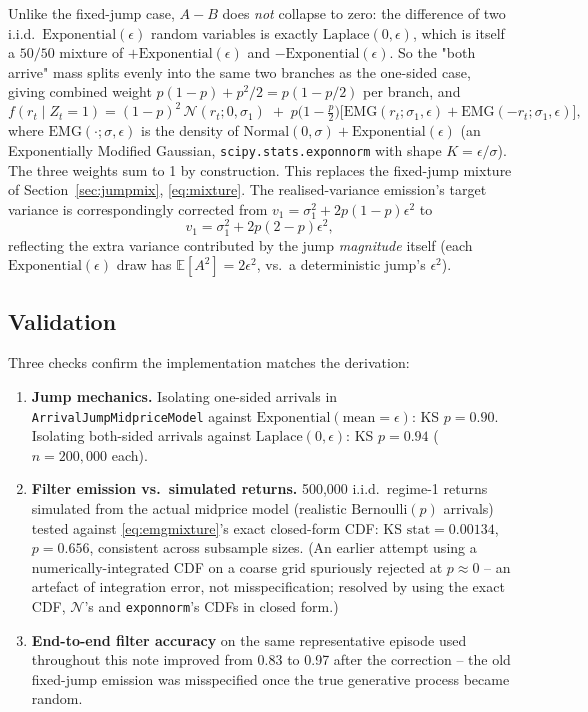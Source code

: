 \documentclass[11pt]{article}
\newcommand{\E}{\mathbb{E}}
\newcommand{\N}{\mathcal{N}}
\begin{document}
Unlike the fixed-jump case, $A-B$ does \emph{not} collapse to zero: the difference of two i.i.d.\ $\mathrm{Exponential}(\epsilon)$ random variables is exactly $\mathrm{Laplace}(0,\epsilon)$, which is itself a $50/50$ mixture of $+\mathrm{Exponential}(\epsilon)$ and $-\mathrm{Exponential}(\epsilon)$. So the "both arrive" mass splits evenly into the same two branches as the one-sided case, giving combined weight $p(1-p) + p^2/2 = p(1-p/2)$ per branch, and
\begin{equation}
f(r_t \mid Z_t{=}1) = (1-p)^2\,\N(r_t;0,\sigma_1) \;+\; p\Big(1-\tfrac{p}{2}\Big)\Big[\mathrm{EMG}(r_t;\sigma_1,\epsilon) + \mathrm{EMG}(-r_t;\sigma_1,\epsilon)\Big],
\label{eq:emgmixture}
\end{equation}
where $\mathrm{EMG}(\cdot;\sigma,\epsilon)$ is the density of $\mathrm{Normal}(0,\sigma) + \mathrm{Exponential}(\epsilon)$ (an Exponentially Modified Gaussian, \texttt{scipy.stats.exponnorm} with shape $K=\epsilon/\sigma$). The three weights sum to 1 by construction. This replaces the fixed-jump mixture of Section~\ref{sec:jumpmix}, \eqref{eq:mixture}. The realised-variance emission's target variance is correspondingly corrected from $v_1 = \sigma_1^2 + 2p(1-p)\epsilon^2$ to
\begin{equation}
v_1 = \sigma_1^2 + 2p(2-p)\epsilon^2,
\label{eq:v1exp}
\end{equation}
reflecting the extra variance contributed by the jump \emph{magnitude} itself (each $\mathrm{Exponential}(\epsilon)$ draw has $\E[A^2]=2\epsilon^2$, vs.\ a deterministic jump's $\epsilon^2$).

\subsection{Validation}
Three checks confirm the implementation matches the derivation:
\begin{enumerate}
\item \textbf{Jump mechanics.} Isolating one-sided arrivals in \texttt{ArrivalJumpMidpriceModel} against $\mathrm{Exponential}(\text{mean}=\epsilon)$: KS $p=0.90$. Isolating both-sided arrivals against $\mathrm{Laplace}(0,\epsilon)$: KS $p=0.94$ ($n=200{,}000$ each).
\item \textbf{Filter emission vs.\ simulated returns.} 500,000 i.i.d.\ regime-1 returns simulated from the actual midprice model (realistic $\mathrm{Bernoulli}(p)$ arrivals) tested against \eqref{eq:emgmixture}'s exact closed-form CDF: KS $\mathrm{stat}=0.00134$, $p=0.656$, consistent across subsample sizes. (An earlier attempt using a numerically-integrated CDF on a coarse grid spuriously rejected at $p\approx0$ -- an artefact of integration error, not misspecification; resolved by using the exact CDF, $\N$'s and \texttt{exponnorm}'s CDFs in closed form.)
\item \textbf{End-to-end filter accuracy} on the same representative episode used throughout this note improved from 0.83 to 0.97 after the correction -- the old fixed-jump emission was misspecified once the true generative process became random.
\end{enumerate}
\end{document}
